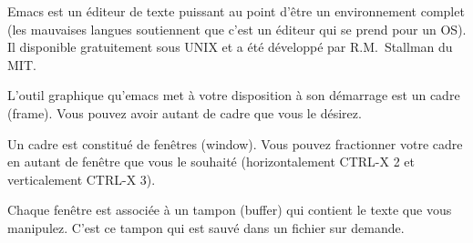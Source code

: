 \documentclass[landscape,12pts]{seminar}
\begin{document}
\begin{slide}
  \listofslides
\end{slide}
\begin{slide}
 
 Emacs est un \'editeur de texte puissant au point d'\^etre un
 environnement complet (les mauvaises langues soutiennent que c'est un
 \'editeur qui se prend pour un OS). Il disponible gratuitement sous
 UNIX et a \'et\'e d\'evelopp\'e par R.M.\ Stallman du MIT.

\end{slide}
\begin{slide}
  L'outil graphique qu'emacs met \`a votre disposition \`a son d\'emarrage
  est un cadre (frame). Vous pouvez avoir autant de cadre que vous le
  d\'esirez.
  
  Un cadre est constitu\'e de fen\^etres (window). Vous pouvez
  fractionner votre cadre en autant de fen\^etre que vous le
  souhait\'e (horizontalement CTRL-X 2 et verticalement CTRL-X 3).
  
  Chaque fen\^etre est associ\'ee \`a un tampon (buffer) qui contient
  le texte que vous manipulez. C'est ce tampon qui est sauv\'e dans un
  fichier sur demande.
  
\end{slide}
\end{document}
